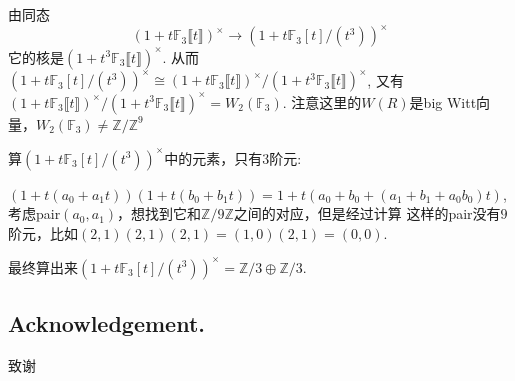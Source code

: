 由同态
\[(1+t \mathbb{F}_3\llbracket t\rrbracket )^{\times} \longrightarrow (1+t \mathbb{F}_3[t]/(t^3))^{\times}\]
它的核是$(1+t^3 \mathbb{F}_3\llbracket t\rrbracket )^{\times}$.
从而$(1+t \mathbb{F}_3[t]/(t^3))^{\times} \cong (1+t \mathbb{F}_3\llbracket t\rrbracket )^{\times}/(1+t^3 \mathbb{F}_3\llbracket t\rrbracket )^{\times}$, 又有$(1+t \mathbb{F}_3\llbracket t\rrbracket )^{\times}/(1+t^3 \mathbb{F}_3\llbracket t\rrbracket )^{\times}= W_2(\mathbb{F}_3)$. 注意这里的$W(R)$是big Witt向量，$W_2(\mathbb{F}_3) \neq \mathbb{Z}/\mathbb{Z}^9$


算$(1+t \mathbb{F}_3[t]/(t^3))^{\times}$中的元素，只有$3$阶元:

$(1+t(a_0+a_1t))(1+t(b_0+b_1t))=1+t(a_0+b_0+(a_1+b_1+a_0b_0)t)$,
考虑pair$(a_0,a_1)$，想找到它和$\mathbb{Z}/9 \mathbb{Z}$之间的对应，但是经过计算
这样的pair没有$9$阶元，比如$(2,1)(2,1)(2,1)=(1,0)(2,1)=(0,0)$.

最终算出来$(1+t \mathbb{F}_3[t]/(t^3))^{\times} = \mathbb{Z}/3 \oplus \mathbb{Z}/3$.


\subsection*{Acknowledgement.}
致谢